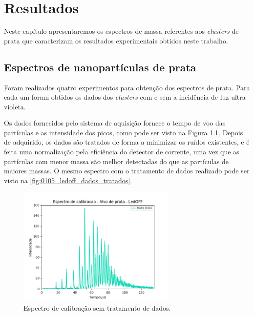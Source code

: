 \chapter{Resultados}
\label{resultados}

Neste capítulo apresentaremos os espectros de massa referentes aos \textit{clusters} de prata que caracterizam os resultados experimentais obtidos neste trabalho.

\section{Espectros de nanopartículas de prata}
\label{sec:producao_cluster}
Foram realizados quatro experimentos para obtenção dos espectros de prata. Para cada um foram obtidos os dados dos \textit{clusters} com e sem a incidência de luz ultra violeta. 

Os dados fornecidos pelo sistema de aquisição
fornece o tempo de voo das partículas e as intensidade dos picos, como pode ser visto na Figura \ref{fig:ex_dados_brutos}. Depois de adquirido, os dados são tratados de forma a minimizar os ruídos existentes, e é feita uma normalização pela eficiência do detector de corrente, uma vez que as partículas com menor massa são melhor detectadas do que as partículas de maiores massas. O mesmo espectro com o tratamento de dados realizado pode ser visto na \ref{fig:0105_ledoff_dados_tratados}.




\begin{figure}
  \centering  
  \includegraphics[width=0.7\textwidth]{graficos_resultados/0105_LEDOFF_semtratamento_exemplo.png}
  \caption{Espectro de calibração sem tratamento de dados.}
  \label{fig:ex_dados_brutos} 
\end{figure}

